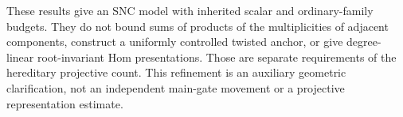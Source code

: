 \begin{remark}
These results give an SNC model with inherited scalar
and ordinary-family budgets. They do not bound sums of
products of the multiplicities of adjacent components,
construct a uniformly controlled twisted anchor, or
give degree-linear root-invariant Hom presentations.
Those are separate requirements of the hereditary
projective count. This refinement is an auxiliary
geometric clarification, not an independent main-gate
movement or a projective representation estimate.
\end{remark}
